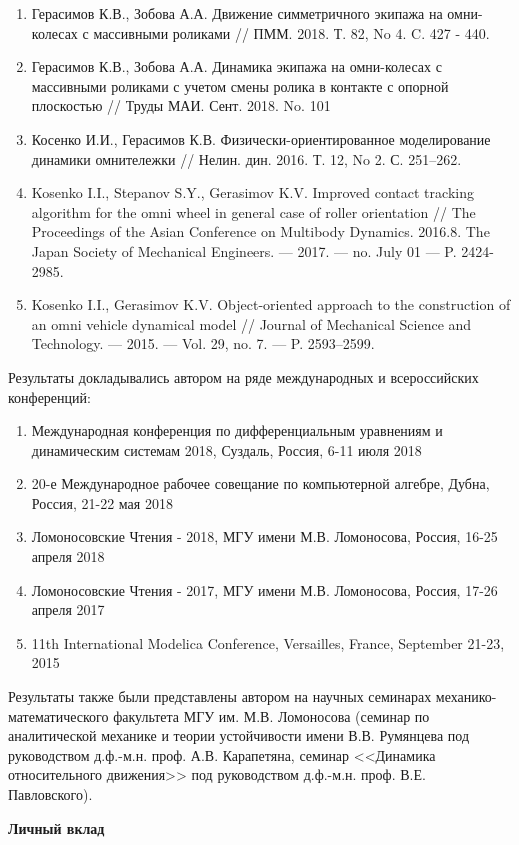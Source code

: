 \begin{enumerate}
	\item Герасимов К.В., Зобова А.А. Движение симметричного экипажа на омни-колесах с массивными роликами // ПММ. 2018. Т. 82, No 4. C. 427 - 440.
	\item Герасимов К.В., Зобова А.А. Динамика экипажа на омни-колесах с массивными роликами с учетом смены ролика в контакте с опорной плоскостью // Труды МАИ. Сент. 2018. No. 101
	\item Косенко И.И., Герасимов К.В. Физически-ориентированное моделирование динамики омнитележки // Нелин. дин. 2016. Т. 12, No 2. С. 251–262.
	\item Kosenko I.I., Stepanov S.Y., Gerasimov K.V. Improved contact tracking algorithm for the omni wheel in general case of roller orientation // The Proceedings of the Asian Conference on Multibody Dynamics. 2016.8. The Japan Society of Mechanical Engineers. — 2017. — no. July 01 — P. 2424-2985.	
	\item Kosenko I.I., Gerasimov K.V. Object-oriented approach to the construction of an omni vehicle dynamical model // Journal of Mechanical Science and Technology. — 2015. — Vol. 29, no. 7. — P. 2593–2599.
\end{enumerate}
Результаты докладывались автором на ряде международных и всероссийских конференций:
	\begin{enumerate}
    	\item Международная конференция по дифференциальным уравнениям и динамическим системам 2018, Суздаль, Россия, 6-11 июля 2018
    	\item 20-е Международное рабочее совещание по компьютерной алгебре, Дубна, Россия, 21-22 мая 2018	
    	\item Ломоносовские Чтения - 2018, МГУ имени М.В. Ломоносова, Россия, 16-25 апреля 2018	
    	\item Ломоносовские Чтения - 2017, МГУ имени М.В. Ломоносова, Россия, 17-26 апреля 2017	
    	\item 11th International Modelica Conference, Versailles, France, September 21-23, 2015
	\end{enumerate}
Результаты также были представлены автором на научных семинарах ме\-ха\-ни\-ко-математического факультета МГУ им. М.В. Ломоносова (семинар по аналитической механике и теории устойчивости имени В.В. Румянцева под руководством д.ф.-м.н. проф. А.В. Карапетяна, семинар <<Динамика относительного движения>> под руководством д.ф.-м.н. проф. В.Е. Павловского).

\textbf{Личный вклад}

